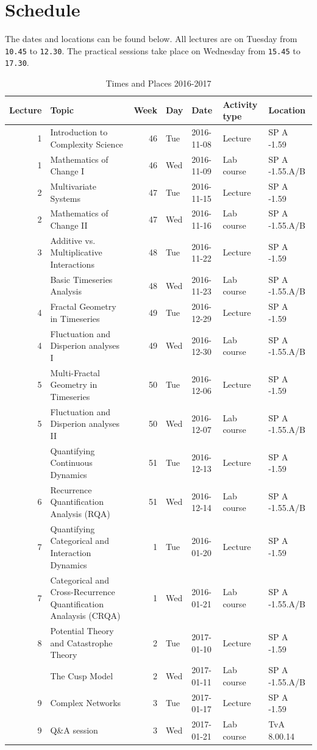 \documentclass[]{book}
\let\stdsection\section
\renewcommand\section{\newpage\stdsection}
\begin{document}
\section{Schedule}\label{schedule}

The dates and locations can be found below. All lectures are on Tuesday
from \texttt{10.45} to \texttt{12.30}. The practical sessions take place
on Wednesday from \texttt{15.45} to \texttt{17.30}.

\begin{table}

\caption{\label{tab:setup2}Times and Places 2016-2017}
\centering
\begin{tabular}[t]{rlrllll}
\toprule
Lecture & Topic & Week & Day & Date & Activity type & Location\\
\midrule
1 & Introduction to Complexity Science & 46 & Tue & 2016-11-08 & Lecture & SP A -1.59\\
1 & Mathematics of Change I & 46 & Wed & 2016-11-09 & Lab course & SP A -1.55.A/B\\
2 & Multivariate Systems & 47 & Tue & 2016-11-15 & Lecture & SP A -1.59\\
2 & Mathematics of Change II & 47 & Wed & 2016-11-16 & Lab course & SP A -1.55.A/B\\
3 & Additive vs. Multiplicative Interactions & 48 & Tue & 2016-11-22 & Lecture & SP A -1.59\\
\addlinespace
3 & Basic Timeseries Analysis & 48 & Wed & 2016-11-23 & Lab course & SP A -1.55.A/B\\
4 & Fractal Geometry in Timeseries & 49 & Tue & 2016-12-29 & Lecture & SP A -1.59\\
4 & Fluctuation and Disperion analyses I & 49 & Wed & 2016-12-30 & Lab course & SP A -1.55.A/B\\
5 & Multi-Fractal Geometry in Timeseries & 50 & Tue & 2016-12-06 & Lecture & SP A -1.59\\
5 & Fluctuation and Disperion analyses II & 50 & Wed & 2016-12-07 & Lab course & SP A -1.55.A/B\\
\addlinespace
6 & Quantifying Continuous Dynamics & 51 & Tue & 2016-12-13 & Lecture & SP A -1.59\\
6 & Recurrence Quantification Analysis (RQA) & 51 & Wed & 2016-12-14 & Lab course & SP A -1.55.A/B\\
7 & Quantifying Categorical and Interaction Dynamics & 1 & Tue & 2016-01-20 & Lecture & SP A -1.59\\
7 & Categorical and Cross-Recurrence Quantification Analaysis (CRQA) & 1 & Wed & 2016-01-21 & Lab course & SP A -1.55.A/B\\
8 & Potential Theory and Catastrophe Theory & 2 & Tue & 2017-01-10 & Lecture & SP A -1.59\\
\addlinespace
8 & The Cusp Model & 2 & Wed & 2017-01-11 & Lab course & SP A -1.55.A/B\\
9 & Complex Networks & 3 & Tue & 2017-01-17 & Lecture & SP A -1.59\\
9 & Q\&A session & 3 & Wed & 2017-01-21 & Lab course & TvA 8.00.14\\
\bottomrule
\end{tabular}
\end{table}
\end{document}
